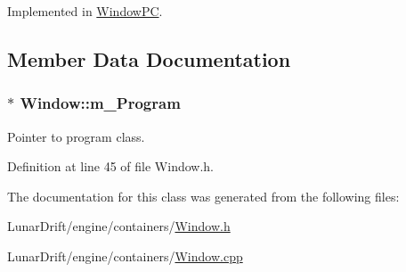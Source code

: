 Implemented in \hyperlink{class_window_p_c_a37f3734410e8a9d99b5de80de7c14bf5}{Window\+PC}.



\subsection{Member Data Documentation}
\subsubsection[{\texorpdfstring{m\+\_\+\+Program}{m_Program}}]{$\ast$ Window\+::m\+\_\+\+Program\hspace{0.3cm}{\ttfamily [private]}}\hypertarget{class_window_afcae84b6b4fbc790bae19b794809f98b}{}\label{class_window_afcae84b6b4fbc790bae19b794809f98b}


Pointer to program class. 



Definition at line 45 of file Window.\+h.



The documentation for this class was generated from the following files\+:\begin{DoxyCompactItemize}
\item 
Lunar\+Drift/engine/containers/\hyperlink{_window_8h}{Window.\+h}\item 
Lunar\+Drift/engine/containers/\hyperlink{_window_8cpp}{Window.\+cpp}\end{DoxyCompactItemize}
